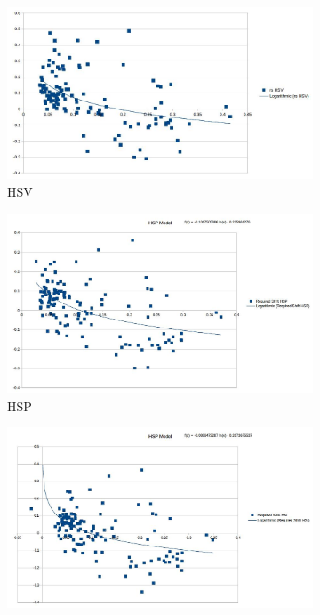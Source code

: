 \documentclass[12pt]{report}
\begin{document}
\begin{figure}
\centering
\begin{subfigure}{.49\linewidth}
  \includegraphics[width=1\linewidth]{figures/model/scatter/model_hsv.jpg}
  \caption{HSV}
\end{subfigure}
\hfill
\begin{subfigure}{.49\linewidth}
  \includegraphics[width=1\linewidth]{figures/model/scatter/model_hsp.jpg}
  \caption{HSP}
\end{subfigure}
\hfill
\begin{subfigure}{.49\linewidth}
  \includegraphics[width=1\linewidth]{figures/model/scatter/model_hsi.jpg}

\end{subfigure}
\end{figure}
\end{document}
